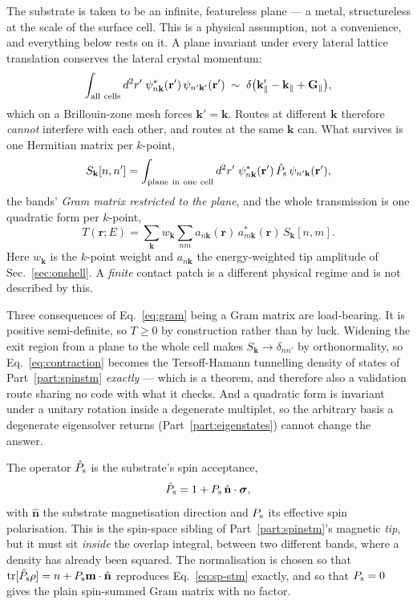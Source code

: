 \documentclass[11pt]{article}
\begin{document}
The substrate is taken to be an infinite, featureless plane --- a metal,
structureless at the scale of the surface cell. This is a physical assumption,
not a convenience, and everything below rests on it. A plane invariant under
every lateral lattice translation conserves the lateral crystal momentum:
\begin{equation}
  \int_{\rm all\ cells} d^2r'\;\psi^*_{n\mathbf k}(\mathbf r')\,
    \psi_{n'\mathbf k'}(\mathbf r')
  \;\sim\;\delta\big(\mathbf k'_\parallel-\mathbf k_\parallel
    +\mathbf G_\parallel\big),
\end{equation}
which on a Brillouin-zone mesh forces $\mathbf k'=\mathbf k$. Routes at
different $\mathbf k$ therefore \emph{cannot} interfere with each other, and
routes at the same $\mathbf k$ can. What survives is one Hermitian matrix per
$k$-point,
\begin{equation}
  S_{\mathbf k}[n,n']=\int_{\rm plane\ in\ one\ cell} d^2r'\;
    \psi^*_{n\mathbf k}(\mathbf r')\,\hat P_{\rm s}\,
    \psi_{n'\mathbf k}(\mathbf r'),
  \label{eq:gram}
\end{equation}
the bands' \emph{Gram matrix restricted to the plane}, and the whole
transmission is one quadratic form per $k$-point,
\begin{equation}
  T(\mathbf r;E)=\sum_{\mathbf k}w_{\mathbf k}\sum_{nm}
    a_{n\mathbf k}(\mathbf r)\,a^*_{m\mathbf k}(\mathbf r)\,
    S_{\mathbf k}[n,m].
  \label{eq:contraction}
\end{equation}
Here $w_{\mathbf k}$ is the $k$-point weight and $a_{n\mathbf k}$ the
energy-weighted tip amplitude of Sec.~\ref{sec:onshell}. A \emph{finite}
contact patch is a different physical regime and is not described by this.

Three consequences of Eq.~\eqref{eq:gram} being a Gram matrix are
load-bearing. It is positive semi-definite, so $T\ge0$ by construction rather
than by luck. Widening the exit region from a plane to the whole cell makes
$S_{\mathbf k}\to\delta_{nn'}$ by orthonormality, so Eq.~\eqref{eq:contraction}
becomes the Tersoff-Hamann tunnelling density of states of
Part~\ref{part:spinstm} \emph{exactly} --- which is a theorem, and therefore
also a validation route sharing no code with what it checks. And a quadratic
form is invariant under a unitary rotation inside a degenerate multiplet, so
the arbitrary basis a degenerate eigensolver returns (Part~\ref{part:eigenstates})
cannot change the answer.

The operator $\hat P_{\rm s}$ is the substrate's spin acceptance,
\begin{equation}
  \hat P_{\rm s}=1+P_{\rm s}\,\hat{\mathbf n}\cdot\boldsymbol\sigma,
\end{equation}
with $\hat{\mathbf n}$ the substrate magnetisation direction and $P_{\rm s}$
its effective spin polarisation. This is the spin-space sibling of
Part~\ref{part:spinstm}'s magnetic \emph{tip}, but it must sit \emph{inside}
the overlap integral, between two different bands, where a density has already
been squared. The normalisation is chosen so that
$\mathrm{tr}[\hat P_{\rm s}\rho]=n+P_{\rm s}\mathbf m\cdot\hat{\mathbf n}$
reproduces Eq.~\eqref{eq:sp-stm} exactly, and so that $P_{\rm s}=0$ gives the
plain spin-summed Gram matrix with no factor.
\end{document}
